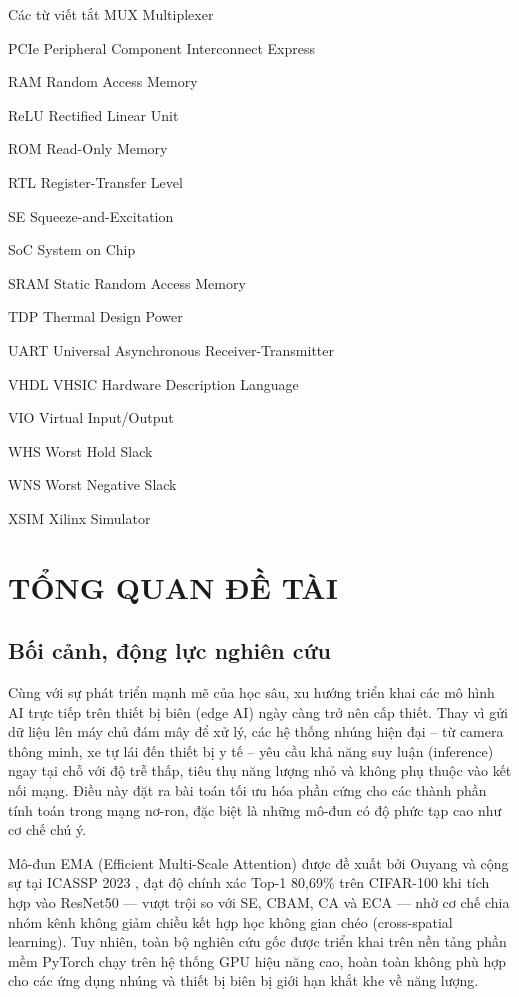 \documentclass{uetgraduation}
\begin{document}
\begin{contentlisting}
\begin{contentlistingsection}{Các từ viết tắt}
MUX \quad Multiplexer

PCIe \quad Peripheral Component Interconnect Express

RAM \quad Random Access Memory

ReLU \quad Rectified Linear Unit

ROM \quad Read-Only Memory

RTL \quad Register-Transfer Level

SE \quad Squeeze-and-Excitation

SoC \quad System on Chip

SRAM \quad Static Random Access Memory

TDP \quad Thermal Design Power

UART \quad Universal Asynchronous Receiver-Transmitter

VHDL \quad VHSIC Hardware Description Language

VIO \quad Virtual Input/Output

WHS \quad Worst Hold Slack

WNS \quad Worst Negative Slack

XSIM \quad Xilinx Simulator
\end{contentlistingsection}

\end{contentlisting}

\chapter{TỔNG QUAN ĐỀ TÀI}
\section{Bối cảnh, động lực nghiên cứu}
Cùng với sự phát triển mạnh mẽ của học sâu, xu hướng triển khai các mô hình AI
trực tiếp trên thiết bị biên (edge AI) ngày càng trở nên cấp thiết. Thay vì gửi
dữ liệu lên máy chủ đám mây để xử lý, các hệ thống nhúng hiện đại -- từ camera
thông minh, xe tự lái đến thiết bị y tế -- yêu cầu khả năng suy luận (inference)
ngay tại chỗ với độ trễ thấp, tiêu thụ năng lượng nhỏ và không phụ thuộc vào kết
nối mạng. Điều này đặt ra bài toán tối ưu hóa phần cứng cho các thành phần tính
toán trong mạng nơ-ron, đặc biệt là những mô-đun có độ phức tạp cao như cơ chế
chú ý.

Mô-đun EMA (Efficient Multi-Scale Attention) được đề xuất bởi Ouyang và cộng sự tại ICASSP 2023 \cite{ema2023}, đạt độ chính xác Top-1 80,69\% trên CIFAR-100 khi tích hợp vào ResNet50 — vượt trội so với SE, CBAM, CA và ECA — nhờ cơ chế chia nhóm kênh không giảm chiều kết hợp học không gian chéo (cross-spatial learning). Tuy nhiên, toàn bộ nghiên cứu gốc được triển khai trên nền tảng phần mềm PyTorch chạy trên hệ thống GPU hiệu năng cao, hoàn toàn không phù hợp cho các ứng dụng nhúng và thiết bị biên bị giới hạn khắt khe về năng lượng. 
\end{document}
